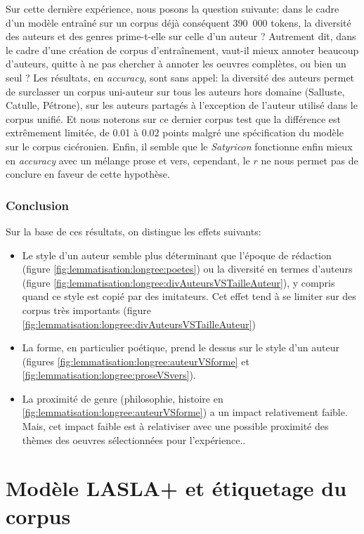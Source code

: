 Sur cette dernière expérience, nous posons la question suivante: dans le cadre d'un modèle entraîné sur un corpus déjà conséquent 390~000 tokens, la diversité des auteurs et des genres prime-t-elle sur celle d'un auteur ? Autrement dit, dans le cadre d'une création de corpus d'entraînement, vaut-il mieux annoter beaucoup d'auteurs, quitte à ne pas chercher à annoter les oeuvres complètes, ou bien un seul ? Les résultats, en \textit{accuracy}, sont sans appel: la diversité des auteurs permet de surclasser un corpus uni-auteur sur tous les auteurs hors domaine (Salluste, Catulle, Pétrone), sur les auteurs partagés à l'exception de l'auteur utilisé dans le corpus unifié. Et nous noterons sur ce dernier corpus test que la différence est extrêmement limitée, de 0.01 à 0.02 points malgré une spécification du modèle sur le corpus cicéronien. Enfin, il semble que le \textit{Satyricon} fonctionne enfin mieux en \textit{accuracy} avec un mélange prose et vers, cependant, le $r$ ne nous permet pas de conclure en faveur de cette hypothèse.

\subsubsection{Conclusion}

Sur la base de ces résultats, on distingue les effets suivants:
\begin{itemize}
    \item Le style d'un auteur semble plus déterminant que l'époque de rédaction (figure \ref{fig:lemmatisation:longree:poetes}) ou la diversité en termes d'auteurs (figure \ref{fig:lemmatisation:longree:divAuteursVSTailleAuteur}), y compris quand ce style est copié par des imitateurs. Cet effet tend à se limiter sur des corpus très importants (figure \ref{fig:lemmatisation:longree:divAuteursVSTailleAuteur})
    \item La forme, en particulier poétique, prend le dessus sur le style d'un auteur (figures \ref{fig:lemmatisation:longree:auteurVSforme} et \ref{fig:lemmatisation:longree:proseVSvers}).
    \item La proximité de genre (philosophie, histoire en \ref{fig:lemmatisation:longree:auteurVSforme}) a un impact relativement faible. Mais, cet impact faible est à relativiser avec une possible proximité des thèmes des oeuvres sélectionnées pour l'expérience..
\end{itemize}

\section{Modèle LASLA+ et étiquetage du corpus}

